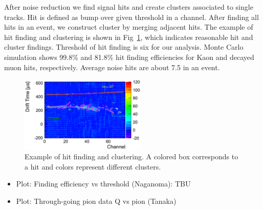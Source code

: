 After noise reduction we find signal hits and create clusters associated to single tracks. 
Hit is defined as bump over given threshold in a channel. 
After finding all hits in an event, we construct cluster by merging adjacent hits. 
The example of hit finding and clustering is shown in Fig~\ref{fig:Clustering}, which indicates reasonable hit and cluster findings. 
Threshold of hit finding is six for our analysis. Monte Carlo simulation shows 99.8\% and 81.8\% hit finding efficiencies for Kaon and decayed muon hits, respectively. 
Average noise hits are about 7.5 in an event.

\begin{figure}[htbp]
 \begin{center}
  \includegraphics[width=60mm]{fig/clustering.eps}
 \end{center}
 \caption{Example of hit finding and clustering. A colored box corresponds to a hit and colors represent different clusters.}
 \label{fig:Clustering}
\end{figure}

\begin{itemize}
\item Plot: Finding efficiency vs threshold (Naganoma): TBU
\item Plot: Through-going pion data Q vs pion (Tanaka)
\end{itemize}
